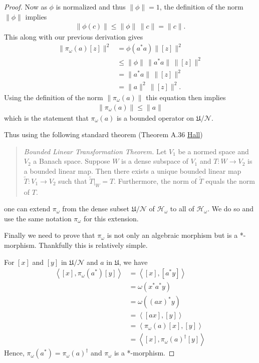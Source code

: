 \begin{proof}
Now as $\phi$ is normalized and thus $\|\phi\|=1$, the definition of the norm $\|\phi\|$ implies
\begin{align}
    \|\phi(c)\| \le \|\phi\| \, \|c\| = \|c\|.
\end{align}
This along with our previous derivation gives
\begin{align}
    \|\pi_\omega(a)[z]\|^2 &= \phi(a^*a) \|[z]\|^2 \\
                           &\le \|\phi\| \, \|a^*a\| \, \|[z]\|^2 \\
                           &=  \|a^*a\| \, \|[z]\|^2 \\
                           &= \|a\|^2 \, \|[z]\|^2.
\end{align}
Using the definition of the norm $\|\pi_\omega(a)\|$ this equation then implies
\begin{align}
    \|\pi_\omega(a)\| \le \|a\|
\end{align}
which is the statement that $\pi_\omega(a)$ is a bounded operator on $\mathfrak{U} / \mathcal{N}$.

Thus using the following standard theorem (Theorem A.36 \href{https://doi.org/10.1007/978-1-4614-7116-5}{Hall})

\begin{quote}
    \textit{Bounded Linear Transformation Theorem.} Let $V_1$ be a normed space and $V_2$ a Banach space. Suppose $W$ is a dense subspace of $V_1$ and $T: W \rightarrow V_2$ is a bounded linear map. Then there exists a unique bounded linear map $\widetilde{T}: V_1 \rightarrow V_2$ such that $\widetilde{T}|_W = T$. Furthermore, the norm of $\widetilde{T}$ equals the norm of $T$.
\end{quote}

\noindent one can extend $\pi_\omega$ from the dense subset $\mathfrak{U} / \mathcal{N}$ of $\mathcal{H}_\omega$ to all of $\mathcal{H}_\omega$. We do so and use the same notation $\pi_\omega$ for this extension.

Finally we need to prove that $\pi_\omega$ is not only an algebraic morphism but is a *-morphism. Thankfully this is relatively simple.

For $[x]$ and $[y]$ in $\mathfrak{U} / \mathcal{N}$ and $a$ in $\mathfrak{U}$, we have
\begin{align}
    \left<[x], \pi_\omega(a^*)[y]\right> &= \left<[x], [a^*y]\right> \\
                                         &= \omega(x^*a^*y) \\
                                         &= \omega((ax)^*y) \\
                                         &= \left<[ax], [y]\right> \\
                                         &= \left<\pi_\omega(a)[x], [y]\right> \\
                                         &= \left<[x], \pi_\omega(a)^\dagger [y]\right>
\end{align}
Hence, $\pi_\omega(a^*) = \pi_\omega(a)^\dagger$ and $\pi_\omega$ is a *-morphism.


\end{proof}
